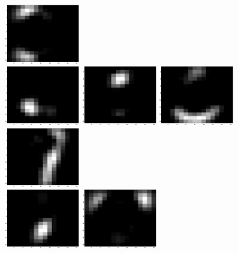 \documentclass{article}
\begin{document}
\includegraphics[width=0.25\textwidth]{codebook12.eps}\\[1em]
\includegraphics[width=0.25\textwidth]{codebook13.eps}\hspace{0.03\textwidth}%
\includegraphics[width=0.25\textwidth]{codebook14.eps}\hspace{0.03\textwidth}%
\includegraphics[width=0.25\textwidth]{codebook15.eps}\hspace{0.03\textwidth}%
\includegraphics[width=0.25\textwidth]{codebook16.eps}\\[1em]
\includegraphics[width=0.25\textwidth]{codebook17.eps}\hspace{0.03\textwidth}%
\includegraphics[width=0.25\textwidth]{codebook18.eps}\hspace{0.03\textwidth}%
\end{document}
